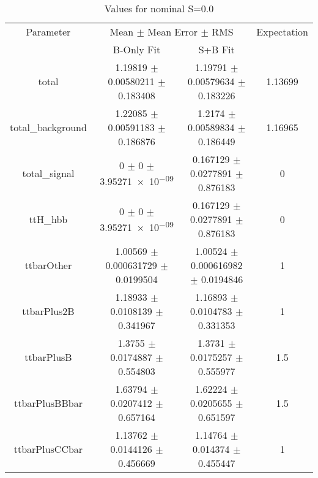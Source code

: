 \begin{table}
\centering
\caption{Values for nominal S=0.0}
\begin{tabular}{cccc}
\toprule
Parameter & \multicolumn{2}{c}{Mean $\pm$ Mean Error $\pm$ RMS} & Expectation\\
 & B-Only Fit & S+B Fit & \\
\midrule
total & \num{1.19819} $\pm$ \num{0.00580211} $\pm$ \num{0.183408} & \num{1.19791} $\pm$ \num{0.00579634} $\pm$ \num{0.183226} & \num{1.13699}\\
total\_background & \num{1.22085} $\pm$ \num{0.00591183} $\pm$ \num{0.186876} & \num{1.2174} $\pm$ \num{0.00589834} $\pm$ \num{0.186449} & \num{1.16965}\\
total\_signal & \num{0} $\pm$ \num{0} $\pm$ \num{3.95271e-09} & \num{0.167129} $\pm$ \num{0.0277891} $\pm$ \num{0.876183} & \num{0}\\
ttH\_hbb & \num{0} $\pm$ \num{0} $\pm$ \num{3.95271e-09} & \num{0.167129} $\pm$ \num{0.0277891} $\pm$ \num{0.876183} & \num{0}\\
ttbarOther & \num{1.00569} $\pm$ \num{0.000631729} $\pm$ \num{0.0199504} & \num{1.00524} $\pm$ \num{0.000616982} $\pm$ \num{0.0194846} & \num{1}\\
ttbarPlus2B & \num{1.18933} $\pm$ \num{0.0108139} $\pm$ \num{0.341967} & \num{1.16893} $\pm$ \num{0.0104783} $\pm$ \num{0.331353} & \num{1}\\
ttbarPlusB & \num{1.3755} $\pm$ \num{0.0174887} $\pm$ \num{0.554803} & \num{1.3731} $\pm$ \num{0.0175257} $\pm$ \num{0.555977} & \num{1.5}\\
ttbarPlusBBbar & \num{1.63794} $\pm$ \num{0.0207412} $\pm$ \num{0.657164} & \num{1.62224} $\pm$ \num{0.0205655} $\pm$ \num{0.651597} & \num{1.5}\\
ttbarPlusCCbar & \num{1.13762} $\pm$ \num{0.0144126} $\pm$ \num{0.456669} & \num{1.14764} $\pm$ \num{0.014374} $\pm$ \num{0.455447} & \num{1}\\
\bottomrule
\end{tabular}
\end{table}